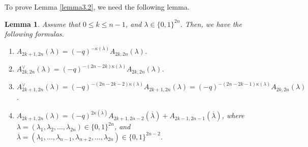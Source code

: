 \documentclass[11pt,oneside]{amsart}
\theoremstyle{plain}
\newtheorem{lemma}[theorem]{Lemma}
\theoremstyle{definition}
\theoremstyle{remark}
\numberwithin{equation}{section}
\begin{document}
	To prove Lemma \ref{lemma3.2}, we need the following lemma.
	
	\begin{lemma}\label{lemma3.6}
		Assume that $0 \leq k \leq n-1$, and $\lambda \in \lbrace 0,1\rbrace^{2n}$. Then, we have the following formulas.
		\begin{enumerate}
			\item $A_{2k+1,2n}(\lambda)=(-q)^{-\kappa(\lambda)}A_{2k,2n}(\lambda)$.
			\item $A_{2k,2n}^{\vee}(\lambda)=(-q)^{-(2n-2k)\kappa(\lambda)}A_{2k,2n}(\lambda)$.
			\item $A_{2k+1,2n}^{\vee}(\lambda)=(-q)^{-(2n-2k-2)\kappa(\lambda)}A_{2k+1,2n}(\lambda)=(-q)^{-(2n-2k-1)\kappa(\lambda)}A_{2k,2n}(\lambda)$.
			\item $A_{2k+1,2n}(\lambda)=(-q)^{2\kappa(\overline{\lambda})}A_{2k+1,2n-2}(\overline{\lambda})+A_{2k-1,2n-1}(\overline{\lambda})$,
			where $\lambda=(\lambda_1,\lambda_2,\dots,\lambda_{2n}) \in \lbrace 0,1\rbrace^{2n}$, and $\overline{\lambda}=(\lambda_1,\dots,\lambda_{n-1},\lambda_{n+2},\dots,\lambda_{2n}) \in \lbrace 0,1\rbrace^{2n-2}$.
		\end{enumerate}
	\end{lemma}
\end{document}
